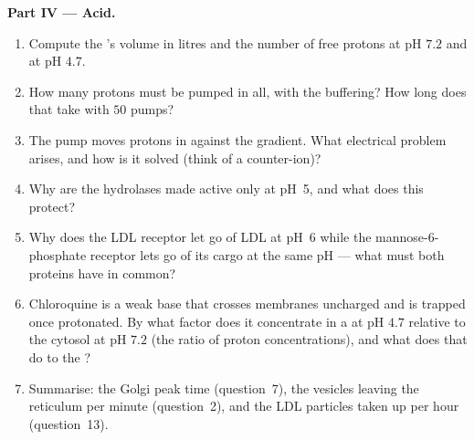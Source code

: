 \begin{problem}
\medskip
\noindent\textbf{Part IV --- Acid.}
\begin{enumerate}[resume]
  \item Compute the 's volume in litres and the number of free
        protons at pH $7.2$ and at pH $4.7$.
  \item How many protons must be pumped in all, with the buffering?
        How long does that take with $50$ pumps?
  \item The pump moves protons in against the gradient. What
        electrical problem arises, and how is it solved (think of a
        counter-ion)?
  \item Why are the hydrolases made active only at pH~5, and what does
        this protect?
  \item Why does the LDL receptor let go of LDL at pH~6 while the
        mannose-6-phosphate receptor lets go of its cargo at the same
        pH --- what must both proteins have in common?
  \item Chloroquine is a weak base that crosses membranes uncharged
        and is trapped once protonated. By what factor does it
        concentrate in a  at pH $4.7$ relative to the cytosol at
        pH $7.2$ (the ratio of proton concentrations), and what does
        that do to the ?
  \item Summarise: the Golgi peak time (question~7), the vesicles
        leaving the reticulum per minute (question~2), and the LDL
        particles taken up per hour (question~13).
\end{enumerate}
\end{problem}

